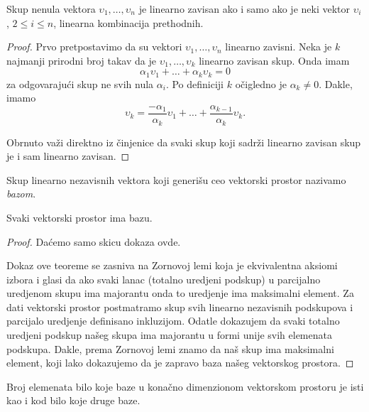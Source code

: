 \documentclass{article}
\begin{document}
\begin{theorem}
  Skup nenula vektora $\upsilon_1, \ldots, \upsilon_n$ je linearno zavisan ako i samo ako je neki vektor $\upsilon_i$, $2 \le i \le n$, linearna kombinacija prethodnih.
\end{theorem}

\begin{proof}
  Prvo pretpostavimo da su vektori $\upsilon_1 , \ldots, \upsilon_n$ linearno zavisni.
  Neka je $k$ najmanji prirodni broj takav da je $\upsilon_1 , \ldots, \upsilon_k$ linearno zavisan skup.
  Onda imam 
  \[\alpha_1 \upsilon_1 + \ldots + \alpha_k \upsilon_k = 0\]
  za odgovarajući skup ne svih nula $\alpha_i$.
  Po definiciji $k$ očigledno je $\alpha_k \neq 0$.
  Dakle, imamo
  \[\upsilon_k = \frac{-\alpha_1}{\alpha_k} \upsilon_1 + \ldots + \frac{\alpha_{k - 1}}{\alpha_k} \upsilon_k.\]

  Obrnuto važi direktno iz činjenice da svaki skup koji sadrži linearno zavisan skup je i sam linearno zavisan.
\end{proof}

\begin{definition}[Baza]
  Skup linearno nezavisnih vektora koji generišu ceo vektorski prostor nazivamo \textit{bazom}.
\end{definition}

\begin{theorem}
  Svaki vektorski prostor ima bazu.
\end{theorem}

\begin{proof}
  Daćemo samo skicu dokaza ovde.

  Dokaz ove teoreme se zasniva na Zornovoj lemi koja je ekvivalentna aksiomi izbora i glasi da ako svaki lanac (totalno uredjeni podskup) u parcijalno uredjenom skupu ima majorantu onda to uredjenje ima maksimalni element.
  Za dati vektorski prostor postmatramo skup svih linearno nezavisnih podskupova i parcijalo uredjenje definisano inkluzijom.
  Odatle dokazujem da svaki totalno uredjeni podskup našeg skupa ima majorantu u formi unije svih elemenata podskupa.
  Dakle, prema Zornovoj lemi znamo da naš skup ima maksimalni element, koji lako dokazujemo da je zapravo baza našeg vektorskog prostora.
\end{proof}

\begin{theorem}
  Broj elemenata bilo koje baze u konačno dimenzionom vektorskom prostoru je isti kao i kod bilo koje druge baze.
\end{theorem}
\end{document}
